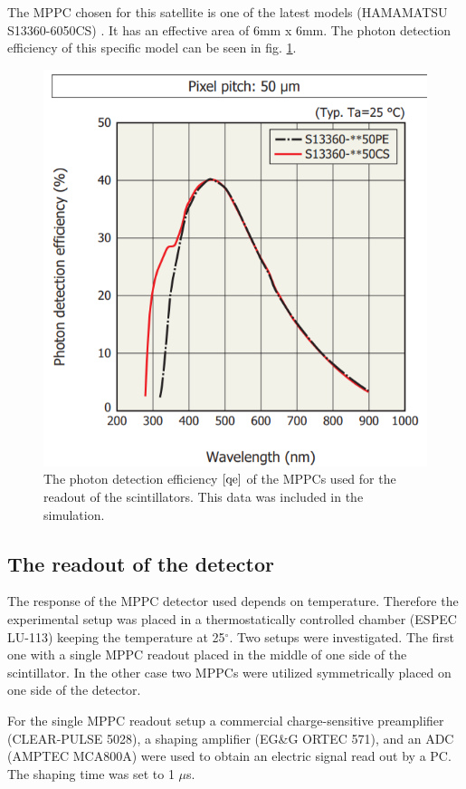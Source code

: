 \documentclass[12pt, a4paper,titlepage]{article}
\numberwithin{equation}{section}
\numberwithin{figure}{section}
\begin{document}
The MPPC chosen for this satellite is one of the latest models (HAMAMATSU S13360-6050CS) \cite{qe}. It has an effective area of 6mm x 6mm. The photon detection efficiency of this specific model can be seen in fig. \ref{fig:qe}.

\begin{figure}[H]
\centering
\includegraphics[width=130.0mm]{images/qe.png}
\caption{The photon detection efficiency $\cite{qe}$ of the MPPCs used for the readout of the scintillators. This data was included in the simulation.}
\label{fig:qe}
\end{figure}


\subsection{The readout of the detector}

The response of the MPPC detector used depends on temperature. Therefore the experimental setup was placed in a thermostatically controlled chamber (ESPEC LU-113) keeping the temperature at 25$^{\circ}$. Two setups were investigated. The first one with a single MPPC readout placed in the middle of one side of the scintillator. In the other case two MPPCs were utilized symmetrically placed on one side of the detector.

For the single MPPC readout setup a commercial charge-sensitive preamplifier (CLEAR-PULSE 5028), a shaping amplifier (EG\&G ORTEC 571), and an ADC (AMPTEC MCA800A) were used to obtain an electric signal read out by a PC. The shaping time was set to 1 $\mu$s.
\end{document}
